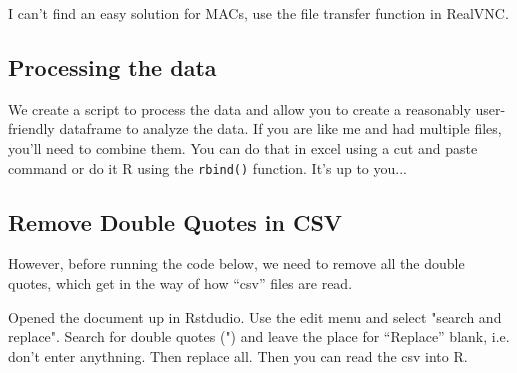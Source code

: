 \documentclass{article}\usepackage[]{graphicx}\usepackage[]{xcolor}
\begin{document}
I can't find an easy solution for MACs, use the file transfer function in RealVNC.

\subsection{Processing the data}

We create a script to process the data and allow you to create a reasonably user-friendly dataframe to analyze the data. If you are like me and had multiple files, you'll need to combine them. You can do that in excel using a cut and paste command or do it R using the \texttt{rbind()} function. It's up to you...

\subsection{Remove Double Quotes in CSV}

However, before running the code below, we need to remove all the double quotes, which get in the way of how ``csv'' files are read.

Opened the document up in Rstdudio. Use the edit menu and select "search and replace". Search for double quotes (") and leave the place for ``Replace'' blank, i.e. don't enter anythning. Then replace all. Then you can read the csv into R. 
\end{document}
